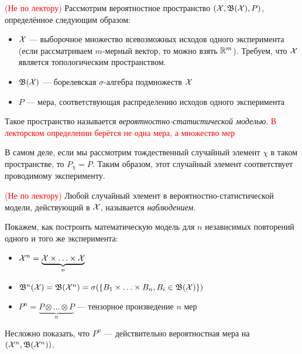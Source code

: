 \begin{definition} \textcolor{red}{(Не по лектору)}
	Рассмотрим вероятностное пространство $(\mathcal{X}, \mathfrak{B}(\mathcal{X}), P)$, определённое следующим образом:
	\begin{itemize}
		\item $\mathcal{X}$ --- выборочное множество всевозможных исходов одного эксперимента (если рассматриваем $m$-мерный вектор, то можно взять $\mathbb{R}^m$). Требуем, что $\mathcal{X}$ является топологическим пространством.
		
		\item $\mathfrak{B}(\mathcal{X})$ --- борелевская $\sigma$-алгебра подмножеств $\mathcal{X}$
		
		\item $P$ --- мера, соответствующая распределению исходов одного эксперимента
	\end{itemize}
	Такое пространство называется \textit{вероятностно-статистической моделью}. \textcolor{red}{В лекторском определении берётся не одна мера, а множество мер}
\end{definition}

\begin{note}
	В самом деле, если мы рассмотрим тождественный случайный элемент $\chi$ в таком пространстве, то $P_\chi = P$. Таким образом, этот случайный элемент соответствует проводимому эксперименту.
\end{note}

\begin{definition} \textcolor{red}{(Не по лектору)}
	Любой случайный элемент в вероятностно-статистической модели, действующий в $\mathcal{X}$, называется \textit{наблюдением}.
\end{definition}

\begin{note}
	Покажем, как построить математическую модель для $n$ независимых повторений одного и того же эксперимента:
	\begin{itemize}
		\item $\mathcal{X}^n = \underbrace{\mathcal{X} \times \ldots \times \mathcal{X}}_n$
		
		\item $\mathfrak{B}^n(\mathcal{X}) = \mathfrak{B}(\mathcal{X}^n) = \sigma(\{B_1 \times \ldots \times B_n, B_i \in \mathfrak{B}(\mathcal{X})\})$
		
		\item $P^n = \underbrace{P \otimes \ldots \otimes P}_n$ --- тензорное произведение $n$ мер
	\end{itemize}
	Несложно показать, что $P^n$ --- действительно вероятностная мера на $(\mathcal{X}^n, \mathfrak{B}(\mathcal{X}^n))$.
\end{note}

